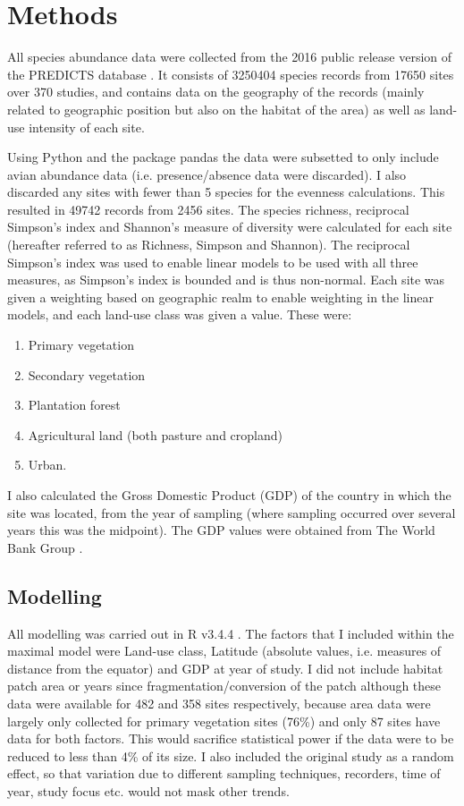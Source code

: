 \documentclass[11pt]{article}
\begin{document}
\section{Methods}

All species abundance data were collected from the 2016 public release version of the PREDICTS database \parencite{Hudson2016}. It consists of 3250404 species records from 17650 sites over 370 studies, and contains data on the geography of the records (mainly related to geographic position but also on the habitat of the area) as well as land-use intensity of each site. 

Using Python \parencite{VanRossum2016} and the package pandas \parencite{McKinney2010} the data were subsetted to only include avian abundance data (i.e. presence/absence data were discarded). I also discarded any sites with fewer than 5 species for the evenness calculations. This resulted in 49742 records from 2456 sites. The species richness, reciprocal Simpson's index and Shannon's measure of diversity were calculated for each site (hereafter referred to as Richness, Simpson and Shannon). The reciprocal Simpson's index was used to enable linear models to be used with all three measures, as Simpson's index is bounded and is thus non-normal.
Each site was given a weighting based on geographic realm to enable weighting in the linear models, and each land-use class was given a value. These were:
\begin{enumerate}[noitemsep, topsep=0pt]
    \item Primary vegetation
    \item Secondary vegetation
    \item Plantation forest
    \item Agricultural land (both pasture and cropland)
    \item Urban.
\end{enumerate}
 I also calculated the Gross Domestic Product (GDP) of the country in which the site was located, from the year of sampling (where sampling occurred over several years this was the midpoint). The GDP values were obtained from The World Bank Group \parencite*{TheWorldBankGroup2018}. 

\subsection{Modelling}

All modelling was carried out in R v3.4.4 \parencite{CoreTeam2019}. The factors that I included within the maximal model were Land-use class, Latitude (absolute values, i.e. measures of distance from the equator) and GDP at year of study. I did not include habitat patch area or years since fragmentation/conversion of the patch although these data were available for 482 and 358 sites respectively, because area data were largely only collected for primary vegetation sites (76\%) and only 87 sites have data for both factors. This would sacrifice statistical power if the data were to be reduced to less than 4\% of its size. I also included the original study as a random effect, so that variation due to different sampling techniques, recorders, time of year, study focus etc. would not mask other trends.
\end{document}

